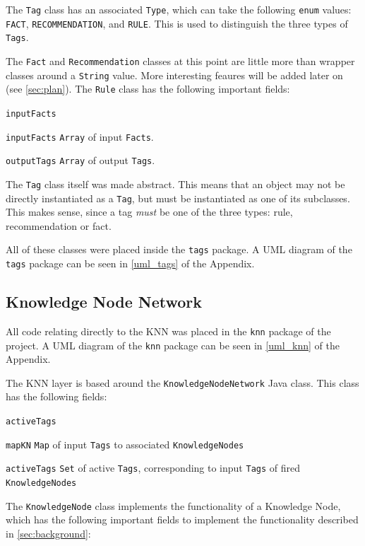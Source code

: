 \documentclass[titlepage,11pt]{article}
\newcommand{\code}[1]{\texttt{#1}}
\begin{document}
The \code{Tag} class has an associated \code{Type}, which can take the following \code{enum} values: \code{FACT}, \code{RECOMMENDATION}, and \code{RULE}. This is used to distinguish the three types of \code{Tags}.

The \code{Fact} and \code{Recommendation} classes at this point are little more than wrapper classes around a \code{String} value. More interesting feaures will be added later on (see \autoref{sec:plan}). The \code{Rule} class has the following important fields:

\begin{labeling}{\code{inputFacts}}
	\item[\code{inputFacts}] \code{Array} of input \code{Facts}.
	\item[\code{outputTags}] \code{Array} of output \code{Tags}.
\end{labeling}

The \code{Tag} class itself was made abstract. This means that an object may not be directly instantiated as a \code{Tag}, but must be instantiated as one of its subclasses. This makes sense, since a tag \emph{must} be one of the three types: rule, recommendation or fact.

All of these classes were placed inside the \code{tags} package. A UML diagram of the \code{tags} package can be seen in \autoref{uml_tags} of the Appendix.

\subsection{Knowledge Node Network}

All code relating directly to the KNN was placed in the \code{knn} package of the project. A UML diagram of the \code{knn} package can be seen in \autoref{uml_knn} of the Appendix.

The KNN layer is based around the \code{KnowledgeNodeNetwork} Java class. This class has the following fields:

\begin{labeling}{\code{activeTags}}
	\item[\code{mapKN}] \code{Map} of input \code{Tags} to associated \code{KnowledgeNodes}
	\item[\code{activeTags}] \code{Set} of active \code{Tags}, corresponding to input \code{Tags} of fired \code{KnowledgeNodes}
\end{labeling}

The \code{KnowledgeNode} class implements the functionality of a Knowledge Node, which has the following important fields to implement the functionality described in \autoref{sec:background}:
\end{document}
